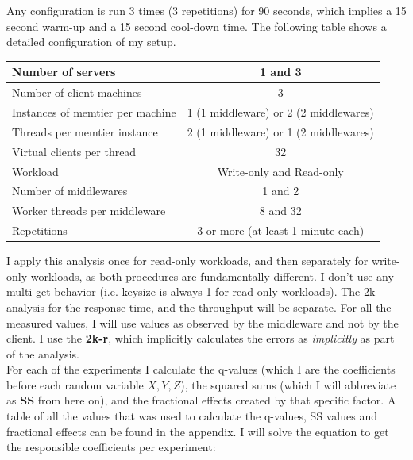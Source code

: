 \documentclass[11pt,a4paper]{article}
\begin{document}
Any configuration is run 3 times (3 repetitions) for 90 seconds, which implies a 15 second warm-up and a 15 second cool-down time.
The following table shows a detailed configuration of my setup.

\begin{center}
	\scriptsize{
		\begin{tabular}{|l|c|}
			\hline Number of servers                & 1 and 3                                     \\ 
			\hline Number of client machines        & 3                                           \\ 
			\hline Instances of memtier per machine & 1 (1 middleware) or 2 (2 middlewares) \\ 
			\hline Threads per memtier instance     & 2 (1 middleware) or 1 (2 middlewares)   \\
			\hline Virtual clients per thread       &  32                                     \\ 
			\hline Workload                         & Write-only and Read-only\\
			\hline Number of middlewares            & 1 and 2                                     \\
			\hline Worker threads per middleware    & 8 and 32                                    \\
			\hline Repetitions                      & 3 or more (at least 1 minute each)                                   \\ 
			\hline 
		\end{tabular}
	} 
\end{center}

I apply this analysis once for read-only workloads, and then separately for write-only workloads, as both procedures are fundamentally different.
I don't use any multi-get behavior (i.e. keysize is always 1 for read-only workloads).
The 2k-analysis for the response time, and the throughput will be separate.
For all the measured values, I will use values as observed by the middleware and not by the client. 
I use the \textbf{2k-r}, which implicitly calculates the errors as \textit{implicitly} as part of the analysis. \\

For each of the experiments I calculate the q-values (which I are the coefficients before each random variable $X, Y, Z$), the squared sums (which I will abbreviate as \textbf{SS} from here on), and the fractional effects created by that specific factor.
A table of all the values that was used to calculate the q-values, SS values and fractional effects can be found in the appendix.
I will solve the equation to get the responsible coefficients per experiment:
\end{document}
